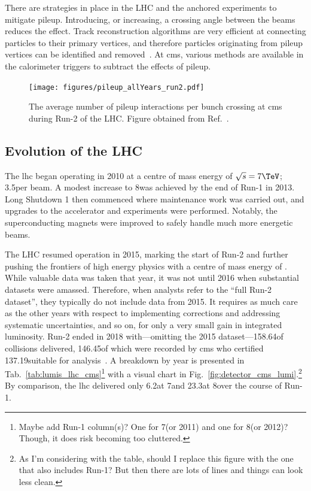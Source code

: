 There are strategies in place in the LHC and the anchored experiments to mitigate \gls{pileup}. Introducing, or increasing, a crossing angle between the beams reduces the effect. Track reconstruction algorithms are very efficient at connecting particles to their primary vertices, and therefore particles originating from \gls{pileup} vertices can be identified and removed~\cite{Chatrchyan:2014fea,Aaboud:2017all}. At \acrshort{cms}, various methods are available in the calorimeter triggers to subtract the effects of \gls{pileup}.

\begin{figure}[htbp]
    \centering
    \texttt{[image: figures/pileup\_allYears\_run2.pdf]}
    \caption[The average number of pileup interactions per bunch crossing at CMS during Run-2 of the LHC]{The average number of \gls{pileup} interactions per bunch crossing at \acrshort{cms} during Run-2 of the LHC. Figure obtained from Ref.~.}
    \label{fig:detector_cms_pileup}
\end{figure}




\subsection{Evolution of the LHC}
\label{subsec:evolution_lhc}

The \acrshort{lhc} began operating in 2010 at a centre of mass energy of $\sqrt{s} = \text{7}\TeV$; 3.5\TeV per beam. A modest increase to 8\TeV was achieved by the end of Run-1 in 2013. Long Shutdown 1 then commenced where maintenance work was carried out, and upgrades to the accelerator and experiments were performed. Notably, the superconducting magnets were improved to safely handle much more energetic beams.

The LHC resumed operation in 2015, marking the start of Run-2 and further pushing the frontiers of high energy physics with a centre of mass energy of \comruntwo. While valuable data was taken that year, it was not until 2016 when substantial datasets were amassed. Therefore, when analysts refer to the ``full Run-2 dataset'', they typically do not include data from 2015. It requires as much care as the other years with respect to implementing corrections and addressing systematic uncertainties, and so on, for only a very small gain in integrated luminosity. Run-2 ended in 2018 with---omitting the 2015 dataset---158.64\fbinv of \pp collisions delivered, 146.45\fbinv of which were recorded by \acrshort{cms} who certified 137.19\fbinv suitable for analysis~\cite{cmslumitwikipage,cmslumipogpage}. A breakdown by year is presented in Tab.~\ref{tab:lumis_lhc_cms}\footnote{Maybe add Run-1 column(s)? One for 7\TeV (or 2011) and one for 8\TeV (or 2012)? Though, it does risk becoming too cluttered.} with a visual chart in Fig.~\ref{fig:detector_cms_lumi}.\footnote{As I'm considering with the table, should I replace this figure with the one that also includes Run-1? But then there are lots of lines and things can look less clean.} By comparison, the \acrshort{lhc} delivered only 6.2\fbinv at 7\TeV and 23.3\fbinv at 8\TeV over the course of Run-1.

